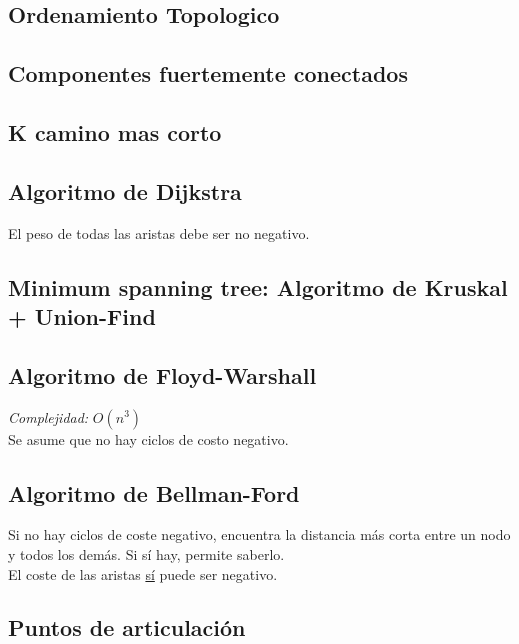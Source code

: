 \documentclass[10pt,letterpaper]{article}
\begin{document}
\subsection{Ordenamiento Topologico}

\subsection{Componentes fuertemente conectados}

\subsection{K camino mas corto}

\subsection{Algoritmo de Dijkstra}
El peso de todas las aristas debe ser no negativo.
\\

\subsection{Minimum spanning tree: Algoritmo de Kruskal + Union-Find}

\subsection{Algoritmo de Floyd-Warshall}
\emph{Complejidad:} $ O(n^3) $ \\
Se asume que no hay ciclos de costo negativo.

\subsection{Algoritmo de Bellman-Ford}
Si no hay ciclos de coste negativo, encuentra la distancia más corta entre un nodo
y todos los demás. Si sí hay, permite saberlo. \\
El coste de las aristas \underline{sí} puede ser negativo.

\subsection{Puntos de articulación}
\end{document}
